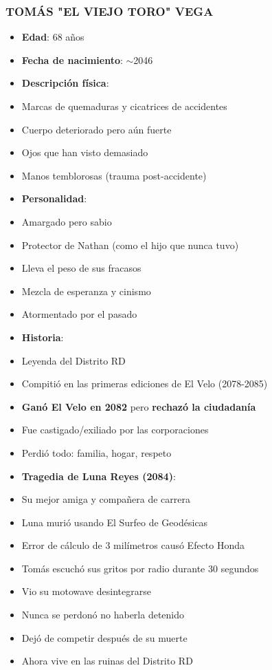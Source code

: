 \documentclass[11pt,a4paper]{report}
\begin{document}
\subsubsection{TOMÁS "EL VIEJO TORO" VEGA}
\begin{itemize}
  \item \textbf{Edad}: 68 años
  \item \textbf{Fecha de nacimiento}: $\sim$2046
  \item \textbf{Descripción física}: 
  \item Marcas de quemaduras y cicatrices de accidentes
  \item Cuerpo deteriorado pero aún fuerte
  \item Ojos que han visto demasiado
  \item Manos temblorosas (trauma post-accidente)
  \item \textbf{Personalidad}: 
  \item Amargado pero sabio
  \item Protector de Nathan (como el hijo que nunca tuvo)
  \item Lleva el peso de sus fracasos
  \item Mezcla de esperanza y cinismo
  \item Atormentado por el pasado
  \item \textbf{Historia}: 
  \item Leyenda del Distrito RD
  \item Compitió en las primeras ediciones de El Velo (2078-2085)
  \item \textbf{Ganó El Velo en 2082} pero \textbf{rechazó la ciudadanía}
  \item Fue castigado/exiliado por las corporaciones
  \item Perdió todo: familia, hogar, respeto
  \item \textbf{Tragedia de Luna Reyes (2084)}: 
  \item Su mejor amiga y compañera de carrera
  \item Luna murió usando El Surfeo de Geodésicas
  \item Error de cálculo de 3 milímetros causó Efecto Honda
  \item Tomás escuchó sus gritos por radio durante 30 segundos
  \item Vio su motowave desintegrarse
  \item Nunca se perdonó no haberla detenido
  \item Dejó de competir después de su muerte
  \item Ahora vive en las ruinas del Distrito RD

\end{itemize}
\end{document}
